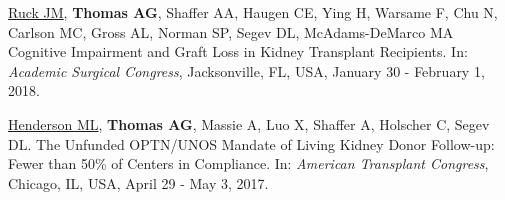 \documentclass[10pt]{article}
\makeatletter
\newlength{\bibhang}
\newlength{\bibsep}
 {\@listi \global\bibsep\itemsep \global\advance\bibsep by\parsep}
\newenvironment{bibenum*}
  {\renewcommand\labelenumi{[\theenumi]}%
   \etaremune[
     topsep=0pt,
     itemsep=\bibsep,
     parsep=0pt,partopsep=0pt,
     itemindent=-\bibhang,
     leftmargin={\bibhang+\widthof{[999]}}]}
  {\endetaremune}
\makeatother
\begin{document}
\begin{bibenum*}



\item \underline{Ruck JM\dag}, \textbf{Thomas AG\dag}, Shaffer AA,
  Haugen CE, Ying H, Warsame F, Chu N, Carlson MC, Gross AL,
  Norman SP, Segev DL, McAdams-DeMarco MA
  Cognitive Impairment and Graft Loss
  in Kidney Transplant Recipients.
  In: \emph{Academic Surgical Congress},
  Jacksonville, FL, USA, January 30 - February 1, 2018.



\item \underline{Henderson ML\dag}, \textbf{Thomas AG\dag}, Massie A,
  Luo X, Shaffer A, Holscher C, Segev DL.
  The Unfunded OPTN/UNOS Mandate of Living Kidney Donor Follow-up:
  Fewer than 50\% of Centers in Compliance.
  In: \emph{American Transplant Congress},
  Chicago, IL, USA, April 29 - May 3, 2017.

\end{bibenum*}
\end{document}
